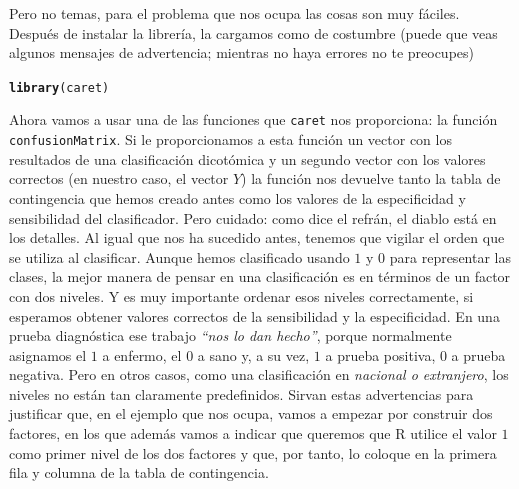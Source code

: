 \documentclass[10pt,a4paper]{article}\usepackage[]{graphicx}\usepackage[]{color}
\makeatletter
\newcommand{\hlstd}[1]{\textcolor[rgb]{0.345,0.345,0.345}{#1}}%
\newcommand{\hlkwd}[1]{\textcolor[rgb]{0.737,0.353,0.396}{\textbf{#1}}}%
\newenvironment{kframe}{%
 \def\at@end@of@kframe{}%
 \ifinner\ifhmode%
  \def\at@end@of@kframe{\end{minipage}}%
  \begin{minipage}{\columnwidth}%
 \fi\fi%
 \def\FrameCommand##1{\hskip\@totalleftmargin \hskip-\fboxsep
 \colorbox{shadecolor}{##1}\hskip-\fboxsep
     \hskip-\linewidth \hskip-\@totalleftmargin \hskip\columnwidth}%
 \MakeFramed {\advance\hsize-\width
   \@totalleftmargin\z@ \linewidth\hsize
   \@setminipage}}%
 {\par\unskip\endMakeFramed%
 \at@end@of@kframe}
\newenvironment{knitrout}{}{} %
\newcounter {cont01}
\makeatother
\begin{document}
Pero no temas, para el problema que nos ocupa las cosas son muy fáciles. Después de instalar la librería, la cargamos como de costumbre  (puede que veas algunos mensajes de advertencia; mientras no haya errores no te preocupes)

\begin{knitrout}
\color{fgcolor}\begin{kframe}
\begin{alltt}
\hlkwd{library}\hlstd{(caret)}
\end{alltt}
\end{kframe}
\end{knitrout}

Ahora vamos a usar una de las funciones que {\tt caret} nos proporciona: la función {\tt confusionMatrix}. Si le proporcionamos a esta función un vector con los resultados de una clasificación dicotómica y  un segundo vector con los valores correctos (en nuestro caso, el vector $Y$) la función nos devuelve tanto la tabla de contingencia que hemos creado antes como los valores de la especificidad y sensibilidad del clasificador. Pero cuidado: como dice el refrán, el diablo está en los detalles. Al igual que nos ha sucedido antes, tenemos que vigilar el orden que se utiliza al clasificar. Aunque hemos clasificado usando $1$ y $0$ para representar las clases, la mejor manera de pensar en una clasificación es en términos de un factor con dos niveles. Y es muy importante ordenar esos niveles correctamente, si esperamos obtener valores correctos de la sensibilidad y la especificidad. En una prueba diagnóstica ese trabajo {\em ``nos lo dan hecho''}, porque normalmente asignamos el $1$ a enfermo, el $0$ a sano y, a su vez, $1$ a prueba positiva, $0$ a prueba negativa. Pero en otros casos, como una clasificación en {\em nacional o extranjero}, los niveles no están tan claramente predefinidos. Sirvan estas advertencias para justificar que, en el ejemplo que nos ocupa, vamos a empezar por construir dos factores, en los que además vamos a indicar que queremos que R utilice el valor $1$ como primer nivel de los dos factores y que, por tanto, lo coloque en la primera fila y columna de la tabla de contingencia.
\end{document}
